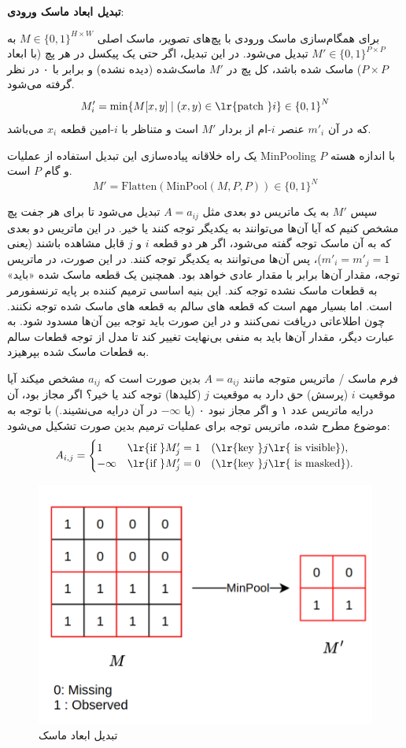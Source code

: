 \textbf{تبدیل ابعاد ماسک ورودی}: 


برای همگام‌سازی ماسک ورودی با پچ‌های تصویر، ماسک اصلی 
$ M \in \{0,1\}^{H \times W} $
به
$ M' \in \{0,1\}^{P \times P} $
 تبدیل می‌شود. در این تبدیل، اگر حتی یک پیکسل در هر پچ (با ابعاد \( P \times P \)) ماسک شده باشد، کل پچ در \( M' \) ماسک‌شده (دیده نشده) و برابر با ۰ در نظر گرفته می‌شود.
$$
M'_i = \min \{ M[x, y] \mid (x, y) \in \text{\lr{patch }} i \} \in {\{0,1\}}^{N}
$$
که در آن $ m'_i $ عنصر $i$-ام از بردار  $M'$ است و متناظر با $i$-امین قطعه $ x_i$  می‌باشد.

یک راه خلاقانه پیاده‌سازی این تبدیل استفاده از عملیات MinPooling با اندازه هسته $P$ و گام $P$ است.
$$
M' = \text{Flatten}(\text{MinPool}(M, P, P)) \in {\{0,1\}}^{N}
$$


سپس $M'$ به یک ماتریس دو بعدی مثل $ A = a_{ij} $ تبدیل می‌شود تا برای هر جفت پچ مشخص کنیم که آیا آن‌ها می‌توانند به یکدیگر توجه کنند یا خیر. در این ماتریس دو بعدی که به آن ماسک توجه
 گفته می‌شود، اگر هر دو قطعه \( i \) و \( j \) قابل مشاهده باشند (یعنی \( m'_i = m'_j = 1 \))، پس آن‌ها می‌توانند به یکدیگر توجه کنند. در این صورت، در ماتریس توجه، مقدار آن‌ها برابر با مقدار عادی خواهد بود. همچنین یک قطعه ماسک شده «باید» به قطعات ماسک نشده توجه کند. این بنیه اساسی ترمیم کننده بر پایه ترنسفورمر است. اما بسیار مهم است که قطعه های سالم به قطعه های ماسک شده توجه نکنند. چون اطلاعاتی دریافت نمی‌کنند و در این صورت باید توجه بین آن‌ها مسدود شود. به عبارت دیگر، مقدار آن‌ها باید به منفی بی‌نهایت تغییر کند تا مدل از توجه قطعات سالم به قطعات ماسک شده بپرهیزد.
 
 فرم ماسک / ماتریس متوجه مانند $ A = a_{ij} $ بدین صورت است که $a_{ij}$ مشخص میکند آیا موقعیت $i$ (پرسش) حق دارد به موقعیت $j$ (کلیدها) توجه کند یا خیر؟ اگر مجاز بود، آن درایه ماتریس عدد ۱ و اگر مجاز نبود ۰ (یا $- \infty$ در آن درایه می‌نشیند.)
 با توجه به موضوع مطرح شده، ماتریس توجه برای عملیات ترمیم بدین صورت تشکیل می‌شود:
$$
  A_{i,j} = \begin{cases} 
	1 & \text{\lr{if }} M'_j = 1 \quad (\text{\lr{key }} j \text{\lr{ is visible}}), \\
	-\infty & \text{\lr{if }} M'_j = 0 \quad (\text{\lr{key }} j \text{\lr{ is masked}}).
\end{cases}
$$


\begin{figure}
	\centering
	\includegraphics[width=0.7\linewidth]{maskConv1}
	\caption{تبدیل ابعاد ماسک}
	\label{fig:maskconv1}
\end{figure}

